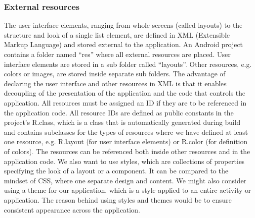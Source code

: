 \subsubsection{External resources}
The user interface elements, ranging from whole screens (called layouts) to the structure and look of a single list element, are defined in XML (Extensible Markup Language) and stored external to the application. An Android project contains a folder named “res” where all external resources are placed. User interface elements are stored in a sub folder called “layouts”. Other resources, e.g. colors or images, are stored inside separate sub folders. The advantage of declaring the user interface and other resources in XML is that it enables decoupling of the presentation of the application and the code that controls the application.
\newline
\newline
All resources must be assigned an ID if they are to be referenced in the application code. All resource IDs are defined as public constants in the project’s R.class, which is a class that is automatically generated during build and contains subclasses for the types of resources where we have defined at least one resource, e.g. R.layout (for user interface elements) or R.color (for definition of colors). The resources can be referenced both inside other resources and in the application code.
\newline
\newline
We also want to use styles, which are collections of properties specifying the look of a layout or a component. It can be compared to the mindset of CSS, where one separate design and content. We might also consider using a theme for our application, which is a style applied to an entire activity or application. The reason behind using styles and themes would be to ensure consistent appearance across the application. 


